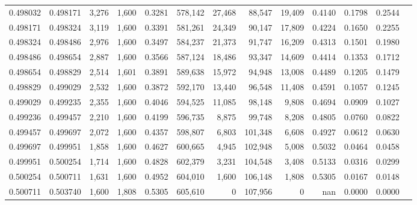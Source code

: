\begin{tabular}{rrrrrrrrrrrrr}
0.498032 & 0.498171 &  3,276 & 1,600 &                                     0.3281 & 578,142 &  27,468 &  88,547 &  19,409 & 0.4140 & 0.1798 & 0.2544 \\
0.498171 & 0.498324 &  3,119 & 1,600 &                                     0.3391 & 581,261 &  24,349 &  90,147 &  17,809 & 0.4224 & 0.1650 & 0.2255 \\
0.498324 & 0.498486 &  2,976 & 1,600 &                                     0.3497 & 584,237 &  21,373 &  91,747 &  16,209 & 0.4313 & 0.1501 & 0.1980 \\
0.498486 & 0.498654 &  2,887 & 1,600 &                                     0.3566 & 587,124 &  18,486 &  93,347 &  14,609 & 0.4414 & 0.1353 & 0.1712 \\
0.498654 & 0.498829 &  2,514 & 1,601 &                                     0.3891 & 589,638 &  15,972 &  94,948 &  13,008 & 0.4489 & 0.1205 & 0.1479 \\
0.498829 & 0.499029 &  2,532 & 1,600 &                                     0.3872 & 592,170 &  13,440 &  96,548 &  11,408 & 0.4591 & 0.1057 & 0.1245 \\
0.499029 & 0.499235 &  2,355 & 1,600 &                                     0.4046 & 594,525 &  11,085 &  98,148 &   9,808 & 0.4694 & 0.0909 & 0.1027 \\
0.499236 & 0.499457 &  2,210 & 1,600 &                                     0.4199 & 596,735 &   8,875 &  99,748 &   8,208 & 0.4805 & 0.0760 & 0.0822 \\
0.499457 & 0.499697 &  2,072 & 1,600 &                                     0.4357 & 598,807 &   6,803 & 101,348 &   6,608 & 0.4927 & 0.0612 & 0.0630 \\
0.499697 & 0.499951 &  1,858 & 1,600 &                                     0.4627 & 600,665 &   4,945 & 102,948 &   5,008 & 0.5032 & 0.0464 & 0.0458 \\
0.499951 & 0.500254 &  1,714 & 1,600 &                                     0.4828 & 602,379 &   3,231 & 104,548 &   3,408 & 0.5133 & 0.0316 & 0.0299 \\
0.500254 & 0.500711 &  1,631 & 1,600 &                                     0.4952 & 604,010 &   1,600 & 106,148 &   1,808 & 0.5305 & 0.0167 & 0.0148 \\
0.500711 & 0.503740 &  1,600 & 1,808 &                                     0.5305 & 605,610 &       0 & 107,956 &       0 &    nan & 0.0000 & 0.0000 \\
\bottomrule
\end{tabular}
